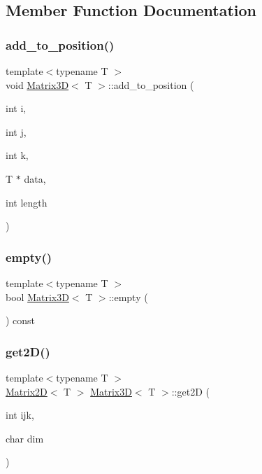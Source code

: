 \subsection{Member Function Documentation}
\mbox{\label{classMatrix3D_a61afc3a397203f453f60772ebc10758a}} 
\subsubsection{\texorpdfstring{add\+\_\+to\+\_\+position()}{add\_to\_position()}}
{\footnotesize\ttfamily template$<$typename T $>$ \\
void \mbox{\hyperlink{classMatrix3D}{Matrix3D}}$<$ T $>$\+::add\+\_\+to\+\_\+position (\begin{DoxyParamCaption}\item[{int}]{i,  }\item[{int}]{j,  }\item[{int}]{k,  }\item[{T $\ast$}]{data,  }\item[{int}]{length }\end{DoxyParamCaption})}

\mbox{\label{classMatrix3D_a6f1e6328bac16786a4bfad6f107db641}} 
\subsubsection{\texorpdfstring{empty()}{empty()}}
{\footnotesize\ttfamily template$<$typename T $>$ \\
bool \mbox{\hyperlink{classMatrix3D}{Matrix3D}}$<$ T $>$\+::empty (\begin{DoxyParamCaption}{ }\end{DoxyParamCaption}) const}

\mbox{\label{classMatrix3D_ac5c77248be46bfef323f0229f6e0a59c}} 
\subsubsection{\texorpdfstring{get2\+D()}{get2D()}}
{\footnotesize\ttfamily template$<$typename T $>$ \\
\mbox{\hyperlink{classMatrix2D}{Matrix2D}}$<$ T $>$ \mbox{\hyperlink{classMatrix3D}{Matrix3D}}$<$ T $>$\+::get2D (\begin{DoxyParamCaption}\item[{int}]{ijk,  }\item[{char}]{dim }\end{DoxyParamCaption})}

